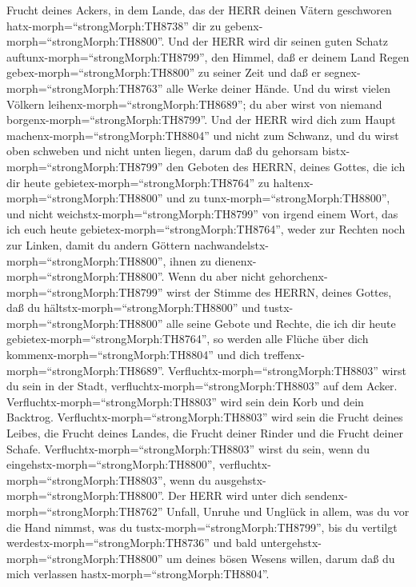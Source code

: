 Frucht deines Ackers, in dem Lande, das der HERR deinen Vätern
geschworen hatx-morph=``strongMorph:TH8738'' dir zu
gebenx-morph=``strongMorph:TH8800''.  Und der HERR wird dir
seinen guten Schatz auftunx-morph=``strongMorph:TH8799'', den Himmel,
daß er deinem Land Regen gebex-morph=``strongMorph:TH8800'' zu seiner
Zeit und daß er segnex-morph=``strongMorph:TH8763'' alle Werke deiner
Hände. Und du wirst vielen Völkern leihenx-morph=``strongMorph:TH8689'';
du aber wirst von niemand borgenx-morph=``strongMorph:TH8799''.
 Und der HERR wird dich zum Haupt
machenx-morph=``strongMorph:TH8804'' und nicht zum Schwanz, und du wirst
oben schweben und nicht unten liegen, darum daß du gehorsam
bistx-morph=``strongMorph:TH8799'' den Geboten des HERRN, deines Gottes,
die ich dir heute gebietex-morph=``strongMorph:TH8764'' zu
haltenx-morph=``strongMorph:TH8800'' und zu
tunx-morph=``strongMorph:TH8800'',  und nicht
weichstx-morph=``strongMorph:TH8799'' von irgend einem Wort, das ich
euch heute gebietex-morph=``strongMorph:TH8764'', weder zur Rechten noch
zur Linken, damit du andern Göttern
nachwandelstx-morph=``strongMorph:TH8800'', ihnen zu
dienenx-morph=``strongMorph:TH8800''.  Wenn du aber nicht
gehorchenx-morph=``strongMorph:TH8799'' wirst der Stimme des HERRN,
deines Gottes, daß du hältstx-morph=``strongMorph:TH8800'' und
tustx-morph=``strongMorph:TH8800'' alle seine Gebote und Rechte, die ich
dir heute gebietex-morph=``strongMorph:TH8764'', so werden alle Flüche
über dich kommenx-morph=``strongMorph:TH8804'' und dich
treffenx-morph=``strongMorph:TH8689''. 
Verfluchtx-morph=``strongMorph:TH8803'' wirst du sein in der Stadt,
verfluchtx-morph=``strongMorph:TH8803'' auf dem Acker. 
Verfluchtx-morph=``strongMorph:TH8803'' wird sein dein Korb und dein
Backtrog.  Verfluchtx-morph=``strongMorph:TH8803'' wird
sein die Frucht deines Leibes, die Frucht deines Landes, die Frucht
deiner Rinder und die Frucht deiner Schafe. 
Verfluchtx-morph=``strongMorph:TH8803'' wirst du sein, wenn du
eingehstx-morph=``strongMorph:TH8800'',
verfluchtx-morph=``strongMorph:TH8803'', wenn du
ausgehstx-morph=``strongMorph:TH8800''.  Der HERR wird
unter dich sendenx-morph=``strongMorph:TH8762'' Unfall, Unruhe und
Unglück in allem, was du vor die Hand nimmst, was du
tustx-morph=``strongMorph:TH8799'', bis du vertilgt
werdestx-morph=``strongMorph:TH8736'' und bald
untergehstx-morph=``strongMorph:TH8800'' um deines bösen Wesens willen,
darum daß du mich verlassen hastx-morph=``strongMorph:TH8804''.
